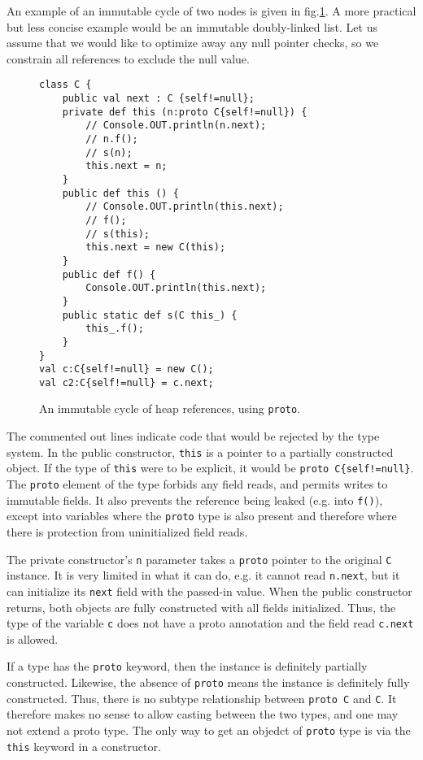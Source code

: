 An example of an immutable cycle of two nodes is given
in fig.\ref{Figure:Cyclic}.  A more practical but less concise example would be
an immutable doubly-linked list.  Let us assume that we would like to optimize
away any null pointer checks, so we constrain all references to exclude the
null value.

\begin{figure}
\begin{lstlisting}
class C {
    public val next : C {self!=null};
    private def this (n:proto C{self!=null}) {
        // Console.OUT.println(n.next);
        // n.f();
        // s(n);
        this.next = n;
    }
    public def this () {
        // Console.OUT.println(this.next);
        // f();
        // s(this);
        this.next = new C(this);
    }
    public def f() {
        Console.OUT.println(this.next);
    }
    public static def s(C this_) {
        this_.f();
    }
}
val c:C{self!=null} = new C();
val c2:C{self!=null} = c.next;
\end{lstlisting}
\caption{An immutable cycle of heap references, using \texttt{proto}.}
\label{Figure:Cyclic}
\end{figure}

The commented out lines indicate code that would be rejected by the type
system.  In the public constructor, \texttt{this} is a pointer to a partially
constructed object.  If the type of \texttt{this} were to be explicit, it would
be \texttt{proto C\{self!=null\}}.  The \texttt{proto} element of the type
forbids any field reads, and permits writes to immutable fields.  It also
prevents the reference being leaked (e.g. into \texttt{f()}), except into
variables where the \texttt{proto} type is also present and therefore where
there is protection from uninitialized field reads.

The private constructor's \texttt{n} parameter takes a \texttt{proto} pointer
to the original \texttt{C} instance.  It is very limited in what it can do,
e.g. it cannot read \texttt{n.next}, but it can initialize its \texttt{next}
field with the passed-in value.  When the public constructor returns, both
objects are fully constructed with all fields initialized.  Thus, the type of
the variable \texttt{c} does not have a proto annotation and the field read
\texttt{c.next} is allowed.

If a type has the \texttt{proto} keyword, then the instance is definitely
partially constructed.  Likewise, the absence of \texttt{proto} means the
instance is definitely fully constructed.  Thus, there is no subtype
relationship between \texttt{proto C} and \texttt{C}.  It therefore makes no
sense to allow casting between the two types, and one may not extend a proto
type.  The only way to get an objedct of \texttt{proto} type is via the
\texttt{this} keyword in a constructor.  

